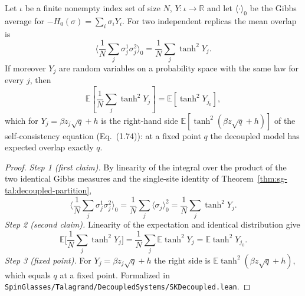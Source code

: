 \begin{theorem}\label{thm:sg-tal:decoupled-overlap}
  \leanok
{}
Let $\iota$ be a finite nonempty index set of size $N$, $Y:\iota\to\mathbb R$ and let $\langle\cdot\rangle_0$ be the Gibbs average for $-H_0(\sigma)=\sum_i\sigma_iY_i$.
For two independent replicas the mean overlap is
\[
\Big\langle \frac1N\sum_{j}\sigma^1_j\sigma^2_j\Big\rangle_0=\frac1N\sum_{j}\tanh^2 Y_j .
\]
If moreover $Y_j$ are random variables on a probability space with the same law for every $j$, then
\[
\mathbb{E}[\frac1N\sum_{j}\tanh^2 Y_j]=\mathbb{E}[\tanh^2 Y_{j_0}],
\]
which for $Y_j=\beta z_j\sqrt q+h$ is the right-hand side $\mathbb{E}[\tanh^2(\beta z\sqrt q+h)]$ of the self-consistency equation (Eq.~(1.74)): at a fixed point $q$ the decoupled model has expected overlap exactly $q$.
\end{theorem}
\begin{proof}
  \leanok
\emph{Step 1 (first claim).} By linearity of the integral over the product of the two identical Gibbs measures and the single-site identity of Theorem~\ref{thm:sg-tal:decoupled-partition},
\[
\Big\langle\frac1N\sum_j\sigma^1_j\sigma^2_j\Big\rangle_0=\frac1N\sum_j\langle\sigma_j\rangle_0^2=\frac1N\sum_j\tanh^2Y_j .
\]
\emph{Step 2 (second claim).} Linearity of the expectation and identical distribution give
\[
\mathbb E\Big[\frac1N\sum_j\tanh^2Y_j\Big]=\frac1N\sum_j\mathbb E\tanh^2Y_j=\mathbb E\tanh^2Y_{j_0}.
\]
\emph{Step 3 (fixed point).} For $Y_j=\beta z_j\sqrt q+h$ the right side is $\mathbb E\tanh^2(\beta z\sqrt q+h)$, which equals $q$ at a fixed point.
Formalized in \texttt{SpinGlasses/Talagrand/DecoupledSystems/SKDecoupled.lean}.
\end{proof}

